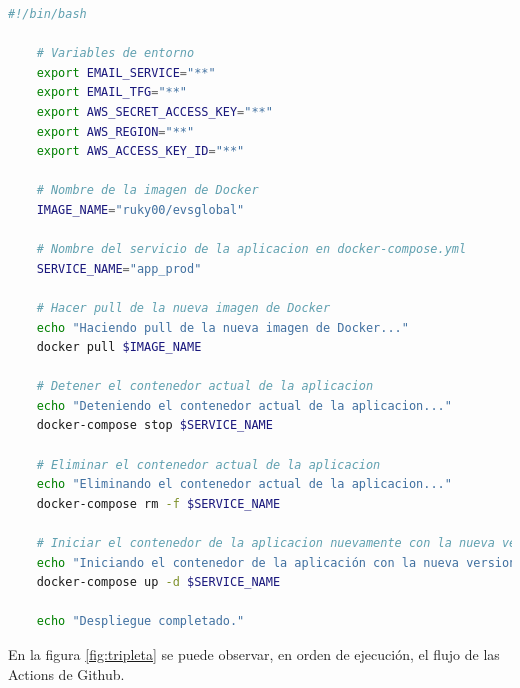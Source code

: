 \begin{lstlisting}[language=Bash, caption=Script de automatización de CD, label=lst:autoCD]
    #!/bin/bash

    # Variables de entorno
    export EMAIL_SERVICE="**"
    export EMAIL_TFG="**"
    export AWS_SECRET_ACCESS_KEY="**"
    export AWS_REGION="**"
    export AWS_ACCESS_KEY_ID="**"

    # Nombre de la imagen de Docker
    IMAGE_NAME="ruky00/evsglobal"

    # Nombre del servicio de la aplicacion en docker-compose.yml
    SERVICE_NAME="app_prod"

    # Hacer pull de la nueva imagen de Docker
    echo "Haciendo pull de la nueva imagen de Docker..."
    docker pull $IMAGE_NAME

    # Detener el contenedor actual de la aplicacion
    echo "Deteniendo el contenedor actual de la aplicacion..."
    docker-compose stop $SERVICE_NAME

    # Eliminar el contenedor actual de la aplicacion
    echo "Eliminando el contenedor actual de la aplicacion..."
    docker-compose rm -f $SERVICE_NAME

    # Iniciar el contenedor de la aplicacion nuevamente con la nueva versión de la imagen
    echo "Iniciando el contenedor de la aplicación con la nueva version de la imagen..."
    docker-compose up -d $SERVICE_NAME

    echo "Despliegue completado."
    \end{lstlisting}
\newpage
En la figura \ref{fig:tripleta} se puede observar, en orden de ejecución, el flujo de las Actions de Github.
